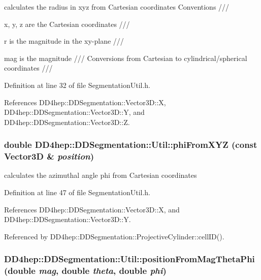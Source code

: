 calculates the radius in xyz from Cartesian coordinates Conventions ///
\begin{DoxyItemize}
\item x, y, z are the Cartesian coordinates ///
\item r is the magnitude in the xy-\/plane ///
\item mag is the magnitude /// Conversions from Cartesian to cylindrical/spherical coordinates /// 
\end{DoxyItemize}

Definition at line 32 of file SegmentationUtil.h.

References DD4hep::DDSegmentation::Vector3D::X, DD4hep::DDSegmentation::Vector3D::Y, and DD4hep::DDSegmentation::Vector3D::Z.\hypertarget{namespace_d_d4hep_1_1_d_d_segmentation_1_1_util_aa8b3866b06a01bd33c74b6b4d5ff48a7}{
\subsubsection[{phiFromXYZ}]{\setlength{\rightskip}{0pt plus 5cm}double DD4hep::DDSegmentation::Util::phiFromXYZ (const Vector3D \& {\em position})}}
\label{namespace_d_d4hep_1_1_d_d_segmentation_1_1_util_aa8b3866b06a01bd33c74b6b4d5ff48a7}


calculates the azimuthal angle phi from Cartesian coordinates 

Definition at line 47 of file SegmentationUtil.h.

References DD4hep::DDSegmentation::Vector3D::X, and DD4hep::DDSegmentation::Vector3D::Y.

Referenced by DD4hep::DDSegmentation::ProjectiveCylinder::cellID().\hypertarget{namespace_d_d4hep_1_1_d_d_segmentation_1_1_util_a7856bceaaa7bcfa56ad6fe03ef007f8e}{
\subsubsection[{positionFromMagThetaPhi}]{ DD4hep::DDSegmentation::Util::positionFromMagThetaPhi (double {\em mag}, \/  double {\em theta}, \/  double {\em phi})}}
\label{namespace_d_d4hep_1_1_d_d_segmentation_1_1_util_a7856bceaaa7bcfa56ad6fe03ef007f8e}


